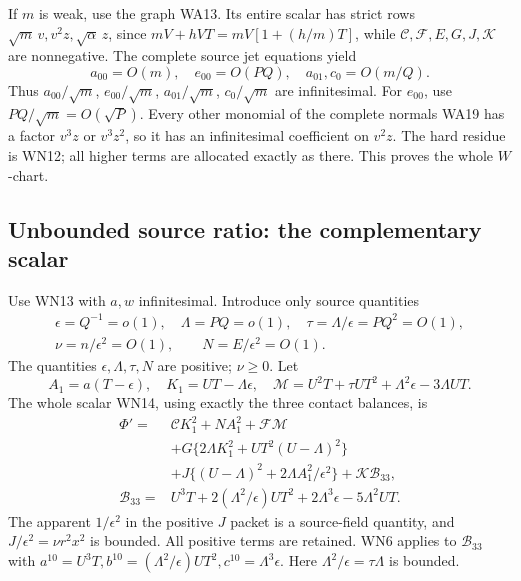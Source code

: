 If \(m\) is weak, use the graph WA13. Its entire scalar has strict
rows \(\sqrt m\,v,v^2z,\sqrt\alpha\,z\), since
\(mV+hVT=mV[1+(h/m)T]\), while \(\mathcal C,\mathcal F,E,G,J,\mathcal K\)
are nonnegative. The complete source jet equations yield
\[
 a_{00}=O(m),\quad e_{00}=O(PQ),\quad
 a_{01},c_0=O(m/Q).
 \tag{WN20}
\]
Thus \(a_{00}/\sqrt m\), \(e_{00}/\sqrt m\),
\(a_{01}/\sqrt m\), \(c_0/\sqrt m\) are infinitesimal.
For \(e_{00}\), use \(PQ/\sqrt m=O(\sqrt P)\).
Every other monomial of the complete normals WA19 has a factor
\(v^3z\) or \(v^3z^2\), so it has an infinitesimal coefficient
on \(v^2z\). The hard residue is WN12; all higher terms are
allocated exactly as there. This proves the whole \(W\)-chart.

\subsection{Unbounded source ratio: the complementary scalar}

Use WN13 with \(a,w\) infinitesimal. Introduce only source quantities
\[
\begin{gathered}
 \epsilon=Q^{-1}=o(1),\quad \Lambda=PQ=o(1),\quad
 \tau=\Lambda/\epsilon=PQ^2=O(1),\\
 \nu=n/\epsilon^2=O(1),\qquad N=E/\epsilon^2=O(1).
\end{gathered}\tag{WN21}
\]
The quantities \(\epsilon,\Lambda,\tau,N\) are positive; \(\nu\geq0\).
Let
\[
 A_1=a(T-\epsilon),\quad K_1=UT-\Lambda\epsilon,\quad
 \mathcal M=U^2T+\tau UT^2+\Lambda^2\epsilon-3\Lambda UT .
 \tag{WN22}
\]
The whole scalar WN14, using exactly the three contact balances, is
\[
\begin{split}
 \Phi'={}&\mathcal C K_1^2+NA_1^2+\mathcal F\mathcal M\\
 &+G\{2\Lambda K_1^2+UT^2(U-\Lambda)^2\}\\
 &+J\{(U-\Lambda)^2+2\Lambda A_1^2/\epsilon^2\}
       +\mathcal K\mathcal B_{33},\\
 \mathcal B_{33}={}&U^3T+2(\Lambda^2/\epsilon)UT^2
                      +2\Lambda^3\epsilon-5\Lambda^2UT .
\end{split}\tag{WN23}
\]
The apparent \(1/\epsilon^2\) in the positive \(J\) packet is
a source-field quantity, and \(J/\epsilon^2=\nu r^2x^2\) is bounded.
All positive terms are retained. WN6 applies to \(\mathcal B_{33}\)
with \(a^{10}=U^3T,b^{10}=(\Lambda^2/\epsilon)UT^2,
c^{10}=\Lambda^3\epsilon\).
Here \(\Lambda^2/\epsilon=\tau\Lambda\) is bounded.

